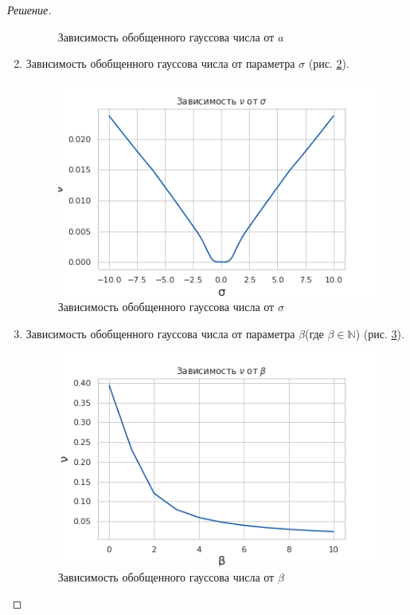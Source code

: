 \documentclass[11pt,a4paper,oneside]{article}
\newenvironment{solution}{
	\begin{proof}[Решение]
		\vspace{-8px}
		\setlength{\parskip}{4px}
		\setlength{\parindent}{0px}
	}{
	\end{proof}
}
\begin{document}
\begin{solution}
\begin{enumerate}
\begin{figure}[!hbtp]
				\caption{Зависимость обобщенного гауссова числа от $a$}
				\label{fig:a}
			\end{figure}
			\item Зависимость обобщенного гауссова числа от параметра $\sigma$ (рис. \ref{fig:sigma}).
			\begin{figure}[!hbtp]
				\centering
				\includegraphics[width=\linewidth]{2ndtaskwithsigma.png}
				\caption{Зависимость обобщенного гауссова числа от $\sigma$}
				\label{fig:sigma}
			\end{figure}
			\item Зависимость обобщенного гауссова числа от параметра $\beta$(где $\beta \in \mathbb{N}$) (рис. \ref{fig:beta}).
			\begin{figure}[!hbtp]
				\centering
				\includegraphics[width=\linewidth]{2ndtaskwithbeta.png}
				\caption{Зависимость обобщенного гауссова числа от $\beta$}
				\label{fig:beta}
			\end{figure}
		\end{enumerate}
		
	\end{solution}
\end{document}

